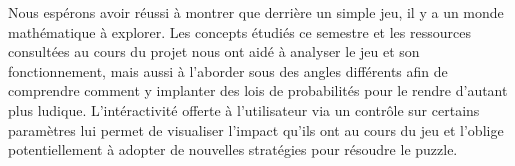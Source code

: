 \documentclass[a4paper, 12pt]{report}
\begin{document}
\tabto{1cm}Nous espérons avoir réussi à montrer que derrière un simple jeu, il y a un monde
mathématique à explorer. Les concepts étudiés ce semestre et les ressources consultées au
cours du projet nous ont aidé à analyser le jeu et son fonctionnement, mais aussi à l'aborder
sous des angles différents afin de comprendre comment y implanter des lois de probabilités
pour le rendre d'autant plus ludique. L'intéractivité offerte à l'utilisateur via un contrôle
sur certains paramètres lui permet de visualiser l'impact qu'ils ont au cours du jeu et l'oblige 
potentiellement à adopter de nouvelles stratégies pour résoudre le puzzle.
\end{document}
